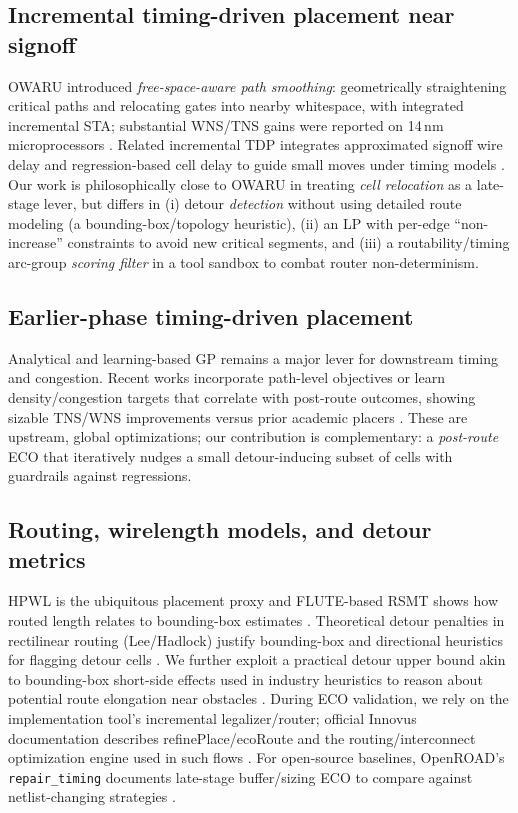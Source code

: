 \subsection{Incremental timing-driven placement near signoff}
OWARU introduced \emph{free-space-aware path smoothing}: geometrically straightening critical paths and relocating gates into nearby whitespace, with integrated incremental STA; substantial WNS/TNS gains were reported on 14\,nm microprocessors \cite{Jung-ICCAD16,Jung-TCAD18}. Related incremental TDP integrates approximated signoff wire delay and regression-based cell delay to guide small moves under timing models \cite{Lee-TVLSI19}. Our work is philosophically close to OWARU in treating \emph{cell relocation} as a late-stage lever, but differs in (i) detour \emph{detection} without using detailed route modeling (a bounding-box/topology heuristic), (ii) an LP with per-edge ``non-increase'' constraints to avoid new critical segments, and (iii) a routability/timing arc-group \emph{scoring filter} in a tool sandbox to combat router non-determinism.

\subsection{Earlier-phase timing-driven placement}
Analytical and learning-based GP remains a major lever for downstream timing and congestion. Recent works incorporate path-level objectives or learn density/congestion targets that correlate with post-route outcomes, showing sizable TNS/WNS improvements versus prior academic placers \cite{Shi-TDPlace-2025,Agnesina-GOALPlace-2024}. These are upstream, global optimizations; our contribution is complementary: a \emph{post-route} ECO that iteratively nudges a small detour-inducing subset of cells with guardrails against regressions.

\subsection{Routing, wirelength models, and detour metrics}
HPWL is the ubiquitous placement proxy and FLUTE-based RSMT shows how routed length relates to bounding-box estimates \cite{Chu-FLUTE-TCAD08}. Theoretical detour penalties in rectilinear routing (Lee/Hadlock) justify bounding-box and directional heuristics for flagging detour cells \cite{Hadlock-Networks77}. We further exploit a practical detour upper bound akin to bounding-box short-side effects used in industry heuristics to reason about potential route elongation near obstacles \cite{US7251800}. During ECO validation, we rely on the implementation tool’s incremental legalizer/router; official Innovus documentation describes refinePlace/ecoRoute and the routing/interconnect optimization engine used in such flows \cite{CadenceInnovus-DS}. For open-source baselines, OpenROAD’s \texttt{repair\_timing} documents late-stage buffer/sizing ECO to compare against netlist-changing strategies \cite{OpenROAD-repairtiming}.

